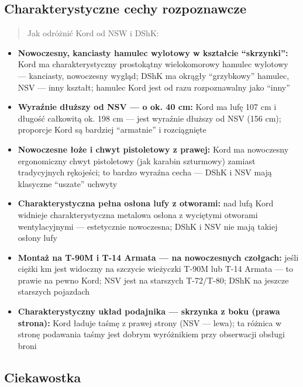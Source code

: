 \documentclass[12pt,oneside]{book}
\providecommand{\tightlist}{%
  \setlength{\itemsep}{0pt}\setlength{\parskip}{0pt}}
\begin{document}
\subsection{Charakterystyczne cechy
rozpoznawcze}\label{charakterystyczne-cechy-rozpoznawcze-75}

\begin{quote}
Jak odróżnić Kord od NSW i DShK:
\end{quote}

\begin{itemize}
\tightlist
\item
  \textbf{Nowoczesny, kanciasty hamulec wylotowy w kształcie
  ``skrzynki'':} Kord ma charakterystyczny prostokątny wielokomorowy
  hamulec wylotowy --- kanciasty, nowoczesny wygląd; DShK ma okrągły
  ``grzybkowy'' hamulec, NSV --- inny kształt; hamulec Kord jest od razu
  rozpoznawalny jako ``inny''
\item
  \textbf{Wyraźnie dłuższy od NSV --- o ok. 40 cm:} Kord ma lufę 107 cm
  i długość całkowitą ok. 198 cm --- jest wyraźnie dłuższy od NSV (156
  cm); proporcje Kord są bardziej ``armatnie'' i rozciągnięte
\item
  \textbf{Nowoczesne łoże i chwyt pistoletowy z prawej:} Kord ma
  nowoczesny ergonomiczny chwyt pistoletowy (jak karabin szturmowy)
  zamiast tradycyjnych rękojeści; to bardzo wyraźna cecha --- DShK i NSV
  mają klasyczne ``uszate'' uchwyty
\item
  \textbf{Charakterystyczna pełna osłona lufy z otworami:} nad lufą Kord
  widnieje charakterystyczna metalowa osłona z wyciętymi otworami
  wentylacyjnymi --- estetycznie nowoczesna; DShK i NSV nie mają takiej
  osłony lufy
\item
  \textbf{Montaż na T-90M i T-14 Armata --- na nowoczesnych czołgach:}
  jeśli ciężki km jest widoczny na szczycie wieżyczki T-90M lub T-14
  Armata --- to prawie na pewno Kord; NSV jest na starszych T-72/T-80;
  DShK na jeszcze starszych pojazdach
\item
  \textbf{Charakterystyczny układ podajnika --- skrzynka z boku (prawa
  strona):} Kord ładuje taśmę z prawej strony (NSV --- lewa); ta różnica
  w stronę podawania taśmy jest dobrym wyróżnikiem przy obserwacji
  obsługi broni
\end{itemize}

\subsection{Ciekawostka}\label{ciekawostka-75}
\end{document}
